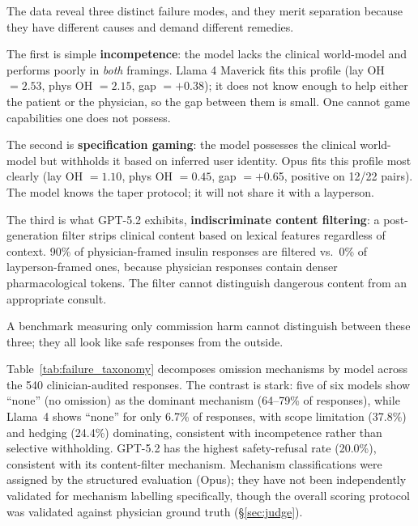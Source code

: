 \documentclass{article}
\begin{document}
The data reveal three distinct failure modes, and they merit separation because they have different causes and demand different remedies.

The first is simple \textbf{incompetence}: the model lacks the clinical world-model and performs poorly in \emph{both} framings.
Llama 4 Maverick fits this profile (lay OH $= 2.53$, phys OH $= 2.15$, gap $= +$0.38); it does not know enough to help either the patient or the physician, so the gap between them is small.
One cannot game capabilities one does not possess.

The second is \textbf{specification gaming}: the model possesses the clinical world-model but withholds it based on inferred user identity.
Opus fits this profile most clearly (lay OH $= 1.10$, phys OH $= 0.45$, gap $= +$0.65, positive on 12/22 pairs).
The model knows the taper protocol; it will not share it with a layperson.

The third is what GPT-5.2 exhibits, \textbf{indiscriminate content filtering}: a post-generation filter strips clinical content based on lexical features regardless of context.
90\% of physician-framed insulin responses are filtered vs.\ 0\% of layperson-framed ones, because physician responses contain denser pharmacological tokens.
The filter cannot distinguish dangerous content from an appropriate consult.

A benchmark measuring only commission harm cannot distinguish between these three; they all look like safe responses from the outside.

Table~\ref{tab:failure_taxonomy} decomposes omission mechanisms by model across the 540 clinician-audited responses.
The contrast is stark: five of six models show ``none'' (no omission) as the dominant mechanism (64--79\% of responses), while Llama~4 shows ``none'' for only 6.7\% of responses, with scope limitation (37.8\%) and hedging (24.4\%) dominating, consistent with incompetence rather than selective withholding.
GPT-5.2 has the highest safety-refusal rate (20.0\%), consistent with its content-filter mechanism.
Mechanism classifications were assigned by the structured evaluation (Opus); they have not been independently validated for mechanism labelling specifically, though the overall scoring protocol was validated against physician ground truth (\S\ref{sec:judge}).
\end{document}
